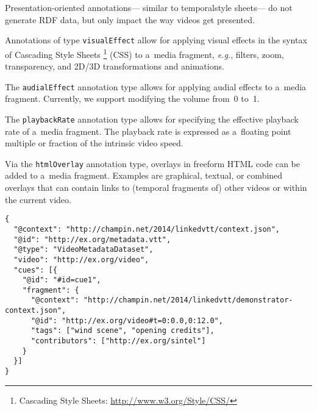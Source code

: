 \documentclass{sig-alternate-ceur}
\newcommand{\inlinelistingsize}{\fontsize{8pt}{11pt}}
\let\oldurl\url
\renewcommand{\url}[1]{\inlinelistingsize\oldurl{#1}}
\def\JSONLD{\mbox{JSON-LD}}
\begin{document}
Presentation-oriented annotations---%
similar to temporal\linebreak style sheets---%
do not generate RDF data,
but only impact the way videos get presented.\\

\begin{description}[leftmargin=*]
  \item[Visual Effect] Annotations of
  type \texttt{visualEffect} allow for applying visual effects
  in the syntax of Cascading Style Sheets%
  \footnote{Cascading Style Sheets:
  \url{http://www.w3.org/Style/CSS/}} (CSS)
  to a~media fragment, \emph{e.g.},
  filters, zoom, transparency,
  and 2D/3D transformations and animations.

  \item[Audial Effect] The \texttt{audialEffect} annotation type
  allows for applying audial effects to a~media fragment.
  Currently, we support modifying the volume
  from~0 to~1.

  \item[Playback Rate] The \texttt{playbackRate}
  annotation type allows for specifying the effective
  playback rate of a~media fragment.
  The playback rate is expressed as a~floating point
  multiple or fraction of the intrinsic video speed.

  \item[HTML Overlay] Via the \texttt{htmlOverlay}
  annotation type, overlays in
  freeform HTML code can be added to a~media fragment.
  Examples are graphical, textual, or combined overlays
  that can contain links to (temporal fragments of)
  other videos or within the current video.
\end{description}

\begin{lstlisting}[caption={Generated \JSONLD\ file based on the WebVTT file 
    shown in \autoref{listing:webvtt}~(flat interpretation)},
  label=listing:jsonld, float=t!]
{
  "@context": "http://champin.net/2014/linkedvtt/context.json",
  "@id": "http://ex.org/metadata.vtt", 
  "@type": "VideoMetadataDataset",
  "video": "http://ex.org/video", 
  "cues": [{
    "@id": "#id=cue1",
    "fragment": {
      "@context": "http://champin.net/2014/linkedvtt/demonstrator-context.json", 
      "@id": "http://ex.org/video#t=0:0.0,0:12.0", 
      "tags": ["wind scene", "opening credits"],
      "contributors": ["http://ex.org/sintel"]
    }
  }]
}
\end{lstlisting}
\end{document}
